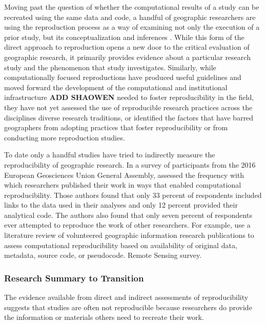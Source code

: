 \documentclass[]{interact}
\theoremstyle{plain}%
\theoremstyle{definition}
\theoremstyle{remark}
\begin{document}
Moving past the question of whether the computational results of a study can be recreated using the same data and code, a handful of geographic researchers are using the reproduction process as a way of examining not only the execution of a prior study, but its conceptualization and inferences \citep{Kedron_MollaloRP, Kedron_SaffaryRP, Kedron_VijayanRP}. 
While this form of the direct approach to reproduction opens a new door to the critical evaluation of geographic research, it primarily provides evidence about a particular research study and the phenomenon that study investigates. 
Similarly, while computationally focused reproductions have produced useful guidelines \citep{hofer2019reproducible, wilson2021} and moved forward the development of the computational and institutional infrastructure \citep{Kedron_Holler_Bardin_Hilgendorf_2022, nust2019, nust2021,}\textbf{ADD SHAOWEN} needed to foster reproducibility in the field, they have not yet assessed the use of reproducible research practices across the disciplines diverse research traditions, or identified the factors that have barred geographers from adopting practices that foster reproducibility or from conducting more reproduction studies. 

To date only a handful studies have tried to indirectly measure the reproducibility of geographic research.
In a survey of participants from the 2016 European Geosciences Union General Assembly, \citet{konkol2019} assessed the frequency with which researchers published their work in ways that enabled computational reproducibility. 
Those authors found that only 33 percent of respondents included links to the data used in their analyses and only 12 percent provided their analytical code. 
The authors also found that only seven percent of respondents ever attempted to reproduce the work of other researchers.
For example, \citet{ostermann2017} use a literature review of volunteered geographic information research publications to assess computational reproducibility based on availability of original data, metadata, source code, or pseudocode.
Remote Sensing survey.

\subsubsection*{Research Summary to Transition}
The evidence available from direct and indirect assessments of reproducibility suggests that studies are often not reproducible because researchers do provide the information or materials others need to recreate their work. 
\end{document}
